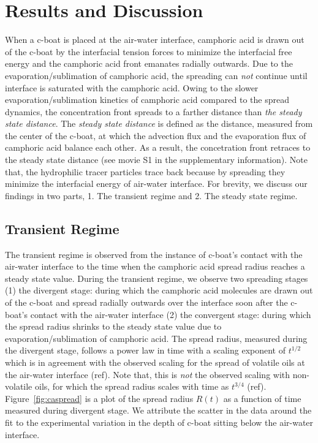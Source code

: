 \documentclass[aps, twocolumn, floatfix, superscriptaddress]{revtex4}
\begin{document}
\section{Results and Discussion}
When a c-boat is placed at the air-water interface, camphoric acid is drawn out of the c-boat by the interfacial tension forces to minimize the interfacial free energy and the camphoric acid front emanates radially outwards. Due to the evaporation/sublimation of camphoric acid, the spreading can \emph{not} continue until interface is saturated with the camphoric acid. Owing to the slower evaporation/sublimation kinetics of camphoric acid compared to the spread dynamics, the concentration front spreads to a farther distance than \emph{the steady state distance}. The \emph{steady state distance} is defined as the distance, measured from the center of the c-boat, at which the advection flux and the evaporation flux of camphoric acid balance each other. As a result, the concetration front retraces to the steady state distance (see movie S1 in the supplementary information). Note that, the hydrophilic tracer particles trace back because by spreading they minimize the interfacial energy of air-water interface. For brevity, we discuss our findings in two parts, 1. The transient regime and 2. The steady state regime. 
\subsection{Transient Regime}
\label{sec:transient}
The transient regime is observed from the instance of c-boat's contact with the air-water interface to the time when the camphoric acid spread radius reaches a steady state value. During the transient regime, we observe two spreading stages (1) the divergent stage: during which the camphoric acid molecules are drawn out of the c-boat and spread radially outwards over the interface soon after the c-boat's contact with the air-water interface (2) the convergent stage: during which the spread radius shrinks to the steady state value due to evaporation/sublimation of camphoric acid. The spread radius, measured during the divergent stage, follows a power law in time with a scaling exponent of $t^{1/2}$ which is in agreement with the observed scaling for the spread of volatile oils at the air-water interface (ref). Note that, this is \emph{not} the observed scaling with non-volatile oils, for which the spread radius scales with time as $t^{3/4}$ (ref). Figure~\ref{fig:caspread} is a plot of the spread radius $R(t)$ as a function of time measured during divergent stage. We attribute the scatter in the data around the fit to the experimental variation in the depth of c-boat sitting below the air-water interface.   
\end{document}
